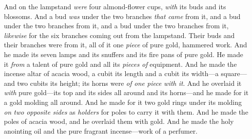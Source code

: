 \begin{biblechapter}
\verse And on the lampstand \textit{were} four almond-flower cups, \textit{with} its buds and its blossoms.
\verse And a bud \textit{was} under the two branches \textit{that came} from it, and a bud under the two branches from it, and a bud under the two branches from it, \textit{likewise} for the six branches coming out from the lampstand.
\verse Their buds and their branches were from it, all of it one \textit{piece} of pure gold, hammered work.
\verse And he made its seven lamps and its snuffers and its fire pans of pure gold.
\verse He made it \textit{from} a talent of pure gold and all its \textit{pieces of} equipment.
 And he made the incense altar of acacia wood, a cubit its length and a cubit its width—a square—and two cubits its height; its horns were \textit{of one piece with it}.
\verse And he overlaid it \textit{with} pure gold—its top and its sides all around and its horns—and he made for it a gold molding all around.
\verse And he made for it two gold rings under its molding \textit{on two opposite sides} as \textit{holders} for poles to carry it with them.
\verse And he made the poles of acacia wood, and he overlaid them with gold.
\verse And he made the holy anointing oil and the pure fragrant incense—work of a perfumer.
\end{biblechapter}

